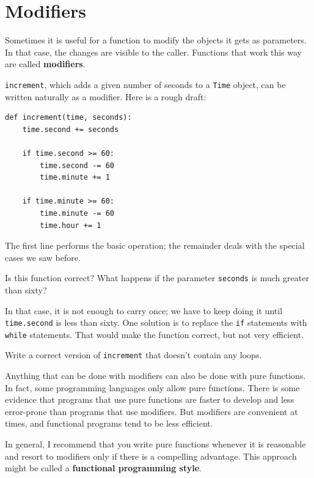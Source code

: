 \documentclass[10pt]{book}
\begin{document}
\section{Modifiers}
\label{increment}

Sometimes it is useful for a function to modify the objects it gets as
parameters.  In that case, the changes are visible to the caller.
Functions that work this way are called {\bf modifiers}.

{\tt increment}, which adds a given number of seconds to a {\tt Time}
object, can be written naturally as a
modifier.  Here is a rough draft:

\begin{verbatim}
def increment(time, seconds):
    time.second += seconds

    if time.second >= 60:
        time.second -= 60
        time.minute += 1

    if time.minute >= 60:
        time.minute -= 60
        time.hour += 1
\end{verbatim}
%
The first line performs the basic operation; the remainder deals
with the special cases we saw before.

Is this function correct?  What happens if the parameter {\tt seconds}
is much greater than sixty?  

In that case, it is not enough to carry
once; we have to keep doing it until {\tt time.second} is less than sixty.
One solution is to replace the {\tt if} statements with {\tt while}
statements.  That would make the function correct, but not
very efficient.

\begin{exercise}

Write a correct version of {\tt increment} that
doesn't contain any loops.

\end{exercise}

Anything that can be done with modifiers can also be done with pure
functions.  In fact, some programming languages only allow pure
functions.  There is some evidence that programs that use pure
functions are faster to develop and less error-prone than programs
that use modifiers.  But modifiers are convenient at times,
and functional programs tend to be less efficient.

In general, I recommend that you write pure functions whenever it is
reasonable and resort to modifiers only if there is a compelling
advantage.  This approach might be called a {\bf functional
programming style}.
\end{document}
